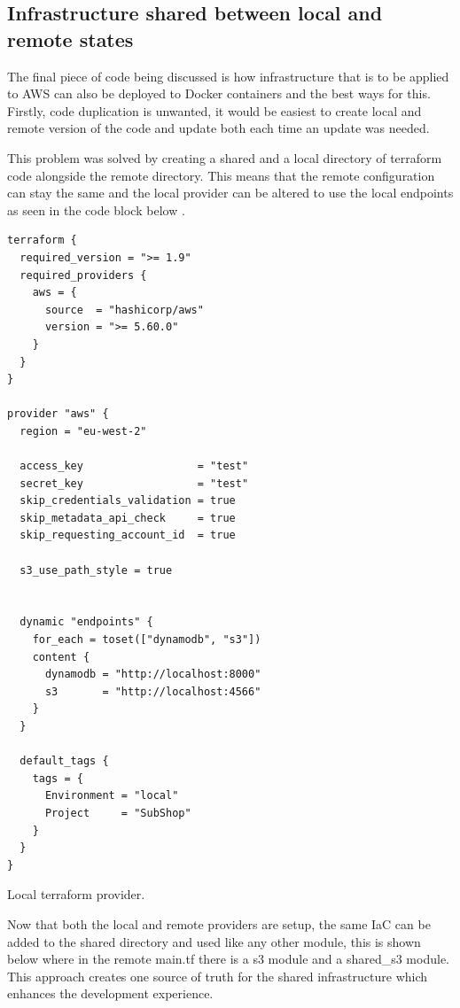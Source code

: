 \documentclass[]{project_report}
\begin{document}
\subsection{Infrastructure shared between local and remote states}

The final piece of code being discussed is how infrastructure that is to be applied to AWS can also be deployed to Docker containers and the best ways for this. Firstly, code duplication is unwanted, it would be easiest to create local and remote version of the code and update both each time an update was needed. 

This problem was solved by creating a shared and a local directory of terraform code alongside the remote directory. This means that the remote configuration can stay the same and the local provider can be altered to use the local endpoints as seen in the code block below \label{code:terraformProvider}.

\begin{codeblock}[H]
    \begin{verbatim}
terraform {
  required_version = ">= 1.9"
  required_providers {
    aws = {
      source  = "hashicorp/aws"
      version = ">= 5.60.0"
    }
  }
}

provider "aws" {
  region = "eu-west-2"

  access_key                  = "test"
  secret_key                  = "test"
  skip_credentials_validation = true
  skip_metadata_api_check     = true
  skip_requesting_account_id  = true

  s3_use_path_style = true


  dynamic "endpoints" {
    for_each = toset(["dynamodb", "s3"])
    content {
      dynamodb = "http://localhost:8000"
      s3       = "http://localhost:4566"
    }
  }

  default_tags {
    tags = {
      Environment = "local"
      Project     = "SubShop"
    }
  }
}
\end{verbatim}
\caption{Local terraform provider.}
\label{code:terraformProvider}
\end{codeblock}

Now that both the local and remote providers are setup, the same IaC can be added to the shared directory and used like any other module, this is shown below \label{code:terraformModules} where in the remote main.tf there is a s3 module and a shared\_s3 module. This approach creates one source of truth for the shared infrastructure which enhances the development experience. 
\end{document}
